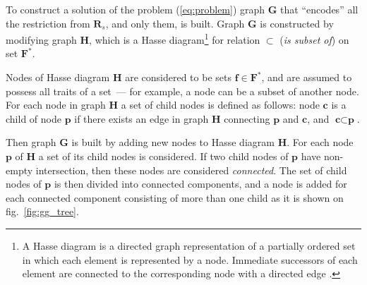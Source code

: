 \documentclass[10pt, conference]{IEEEtran}
\newcommand{\ib}[1]{\textbf{#1}}
\newcommand{\gF}{\ib{F}}
\newcommand{\gG}{\ib{G}}
\newcommand{\gH}{\ib{H}}
\newcommand{\gR}{\ib{R}}
\newcommand{\gRs}{\gR_s}
\newcommand{\gf}{\ib{f}}
\newcommand{\gp}{\ib{p}}
\newcommand{\gc}{\ib{c}}
\newcommand{\gFs}{\gF^*}
\begin{document}
To construct a solution of the problem (\ref{eq:problem}) graph $\gG$ that ``encodes'' all
the restriction from $\gRs$, and only them, is built. Graph $\gG$ is constructed
by modifying graph $\gH$, which is a
Hasse diagram\footnote{A Hasse diagram is a directed graph representation of
a partially ordered set in which each element is represented by a node.
Immediate successors of each element are connected
to the corresponding node with a directed edge \cite{rosen02}.}
for relation $\subset$ (\textit{is subset of}) on set $\gFs$.

Nodes of Hasse diagram $\gH$ are considered to be sets $\gf \in \gFs$,
and are assumed to possess all traits of a set~---
for example, a node can be a subset of another node.
For each node in graph $\gH$ a set of child nodes is defined as follows:
node $\gc$ is a child of node $\gp$ if there exists an edge in graph $\gH$
connecting $\gp$ and $\gc$, and $\gc \subset \gp$.

Then graph $\gG$ is built by adding new nodes to Hasse diagram $\gH$.
For each node $\gp$ of $\gH$ a set of its child nodes is considered.
If two child nodes of $\gp$ have non-empty intersection, then these
nodes are considered \textit{connected}.
The set of child nodes of $\gp$ is then divided into connected components,
and a node is added for each connected component consisting of more than one
child as it is shown on fig.~\ref{fig:gg_tree}.
\end{document}
